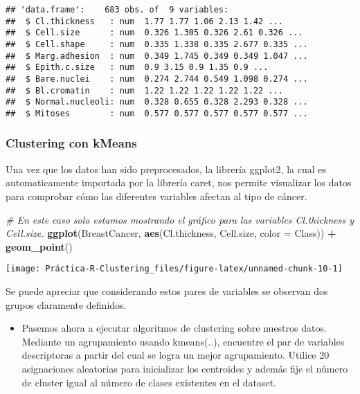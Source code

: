 \documentclass[
]{article}
\newenvironment{Shaded}{\begin{snugshade}}{\end{snugshade}}
\newcommand{\CommentTok}[1]{\textcolor[rgb]{0.56,0.35,0.01}{\textit{#1}}}
\newcommand{\DataTypeTok}[1]{\textcolor[rgb]{0.13,0.29,0.53}{#1}}
\newcommand{\KeywordTok}[1]{\textcolor[rgb]{0.13,0.29,0.53}{\textbf{#1}}}
\newcommand{\NormalTok}[1]{#1}
\newcommand{\OperatorTok}[1]{\textcolor[rgb]{0.81,0.36,0.00}{\textbf{#1}}}
\newcommand{\StringTok}[1]{\textcolor[rgb]{0.31,0.60,0.02}{#1}}
\providecommand{\tightlist}{%
  \setlength{\itemsep}{0pt}\setlength{\parskip}{0pt}}
\begin{document}
\begin{verbatim}
## 'data.frame':    683 obs. of  9 variables:
##  $ Cl.thickness   : num  1.77 1.77 1.06 2.13 1.42 ...
##  $ Cell.size      : num  0.326 1.305 0.326 2.61 0.326 ...
##  $ Cell.shape     : num  0.335 1.338 0.335 2.677 0.335 ...
##  $ Marg.adhesion  : num  0.349 1.745 0.349 0.349 1.047 ...
##  $ Epith.c.size   : num  0.9 3.15 0.9 1.35 0.9 ...
##  $ Bare.nuclei    : num  0.274 2.744 0.549 1.098 0.274 ...
##  $ Bl.cromatin    : num  1.22 1.22 1.22 1.22 1.22 ...
##  $ Normal.nucleoli: num  0.328 0.655 0.328 2.293 0.328 ...
##  $ Mitoses        : num  0.577 0.577 0.577 0.577 0.577 ...
\end{verbatim}

\hypertarget{clustering-con-kmeans}{%
\subsubsection{Clustering con kMeans}\label{clustering-con-kmeans}}

Una vez que los datos han sido preprocesados, la librería ggplot2, la
cual es automaticamente importada por la librería caret, nos permite
visualizar los datos para comprobar cómo las diferentes variables
afectan al tipo de cáncer.

\begin{Shaded}
\begin{Highlighting}[]
\CommentTok{# En este caso solo estamos mostrando el gráfico para las variables Cl.thickness y Cell.size.}
\KeywordTok{ggplot}\NormalTok{(BreastCancer, }\KeywordTok{aes}\NormalTok{(Cl.thickness, Cell.size, }\DataTypeTok{color =}\NormalTok{ Class)) }\OperatorTok{+}\StringTok{ }\KeywordTok{geom_point}\NormalTok{()}
\end{Highlighting}
\end{Shaded}

\begin{center}\texttt{[image: Práctica-R-Clustering\_files/figure-latex/unnamed-chunk-10-1]} \end{center}

Se puede apreciar que considerando estos pares de variables se observan
dos grupos claramente definidos.

\begin{itemize}
\tightlist
\item
  Pasemos ahora a ejecutar algoritmos de clustering sobre nuestros
  datos. Mediante un agrupamiento usando kmeans(..), encuentre el par de
  variables descriptoras a partir del cual se logra un mejor
  agrupamiento. Utilice 20 asignaciones aleatorias para inicializar los
  centroides y además fije el número de cluster igual al número de
  clases existentes en el dataset.
\end{itemize}
\end{document}
